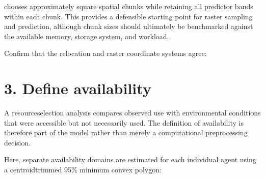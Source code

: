 \documentclass[letterpaper,10pt,english]{sphinxmanual}
\begin{document}
\begin{sphinxVerbatim}[commandchars=\\\{\}]
  

  

  

\end{sphinxVerbatim}

\sphinxAtStartPar
{} chooses approximately square spatial chunks while retaining all predictor bands within each chunk. This provides a defensible starting point for raster sampling and prediction, although chunk sizes should ultimately be benchmarked against the available memory, storage system, and workload.

\sphinxAtStartPar
Confirm that the relocation and raster coordinate systems agree:

\begin{sphinxVerbatim}[commandchars=\\\{\}]
   
\end{sphinxVerbatim}


\section{3. Define availability}
\label{\detokenize{getting_started:define-availability}}
\sphinxAtStartPar
A resource\sphinxhyphen{}selection analysis compares observed use with environmental conditions that were accessible but not necessarily used. The definition of availability is therefore part of the model rather than merely a computational preprocessing decision.

\sphinxAtStartPar
Here, separate availability domains are estimated for each individual agent using a centroid\sphinxhyphen{}trimmed 95\% minimum convex polygon:
\end{document}
